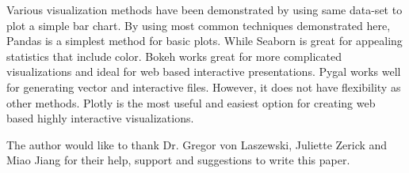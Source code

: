 \documentclass[sigconf]{acmart}
\begin{document}
Various visualization methods have been demonstrated by using same data-set to plot a simple bar chart. By using most common techniques demonstrated here, Pandas is a simplest method for basic plots. While Seaborn is great for appealing statistics that include color. Bokeh works great for more complicated visualizations and ideal for web based interactive presentations. Pygal works well for generating vector and interactive files. However, it does not have flexibility as other methods. Plotly is the most useful and easiest option for creating web based highly interactive visualizations. 


\begin{acks}

  The author would like to thank Dr. Gregor von Laszewski, Juliette Zerick and Miao Jiang for their help, support and suggestions to write this paper.

\end{acks}


 
\end{document}
